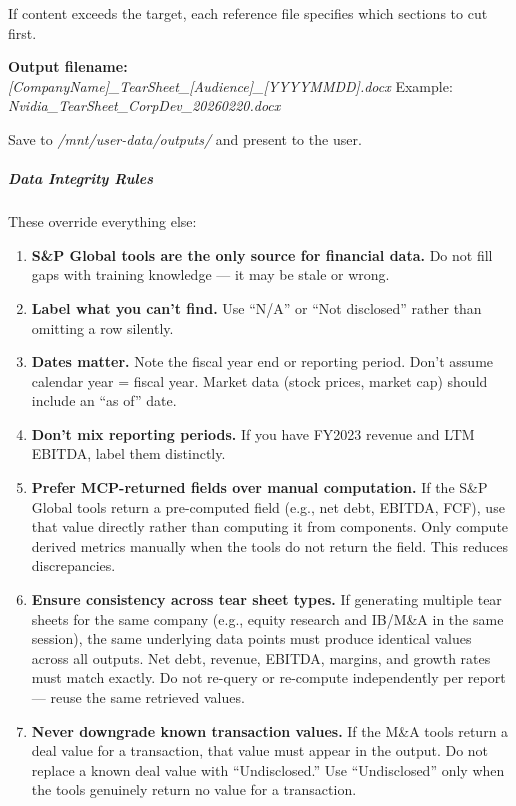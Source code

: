 \documentclass[11pt]{article}
\begin{document}
If content exceeds the target, each reference file specifies which sections to cut first.


\textbf{Output filename:} \emph{[CompanyName]\_\allowbreak{}TearSheet\_\allowbreak{}[Audience]\_\allowbreak{}[YYYYMMDD].docx} Example: \emph{Nvidia\_\allowbreak{}TearSheet\_\allowbreak{}CorpDev\_\allowbreak{}20260220.docx}


Save to \emph{/mnt/user-data/outputs/} and present to the user.


\subparagraph{Data Integrity Rules}\mbox{}\par

These override everything else:

\begin{enumerate}[leftmargin=*,itemsep=2pt,topsep=2pt]
\item {} \textbf{S\&P Global tools are the only source for financial data.} Do not fill gaps with training knowledge — it may be stale or wrong.
\item {} \textbf{Label what you can't find.} Use ``N/A'' or ``Not disclosed'' rather than omitting a row silently.
\item {} \textbf{Dates matter.} Note the fiscal year end or reporting period. Don't assume calendar year = fiscal year. Market data (stock prices, market cap) should include an ``as of'' date.
\item {} \textbf{Don't mix reporting periods.} If you have FY2023 revenue and LTM EBITDA, label them distinctly.
\item {} \textbf{Prefer MCP-returned fields over manual computation.} If the S\&P Global tools return a pre-computed field (e.g., net debt, EBITDA, FCF), use that value directly rather than computing it from components. Only compute derived metrics manually when the tools do not return the field. This reduces discrepancies.
\item {} \textbf{Ensure consistency across tear sheet types.} If generating multiple tear sheets for the same company (e.g., equity research and IB/M\&A in the same session), the same underlying data points must produce identical values across all outputs. Net debt, revenue, EBITDA, margins, and growth rates must match exactly. Do not re-query or re-compute independently per report — reuse the same retrieved values.
\item {} \textbf{Never downgrade known transaction values.} If the M\&A tools return a deal value for a transaction, that value must appear in the output. Do not replace a known deal value with ``Undisclosed.'' Use ``Undisclosed'' only when the tools genuinely return no value for a transaction.

\end{enumerate}
\end{document}
